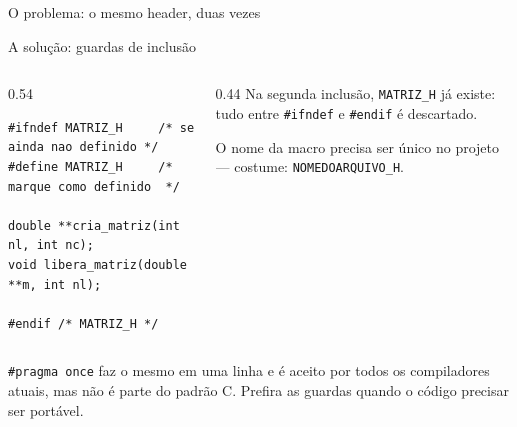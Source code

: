 \documentclass[aspectratio=169]{beamer}
\begin{document}
\begin{frame}{O problema: o mesmo header, duas vezes}
  \begin{center}
  \end{center}
\end{frame}

\begin{frame}[fragile]{A solução: guardas de inclusão}
  \begin{columns}[T]
    \begin{column}{0.54\textwidth}
\begin{lstlisting}[basicstyle=\ttfamily\scriptsize, numbers=none]
#ifndef MATRIZ_H     /* se ainda nao definido */
#define MATRIZ_H     /* marque como definido  */

double **cria_matriz(int nl, int nc);
void libera_matriz(double **m, int nl);

#endif /* MATRIZ_H */
\end{lstlisting}
    \end{column}
    \begin{column}{0.44\textwidth}
      \small
      Na segunda inclusão, \texttt{MATRIZ\_H} já existe: tudo entre
      \texttt{\#ifndef} e \texttt{\#endif} é descartado.

      \medskip
      O nome da macro precisa ser único no projeto --- costume:
      \texttt{NOMEDOARQUIVO\_H}.
    \end{column}
  \end{columns}
  \begin{block}{}
    \small \texttt{\#pragma once} faz o mesmo em uma linha e é aceito por
    todos os compiladores atuais, mas não é parte do padrão C. Prefira as
    guardas quando o código precisar ser portável.
  \end{block}
\end{frame}
\end{document}
